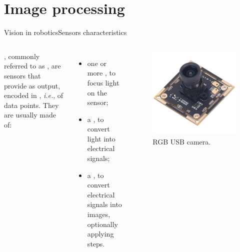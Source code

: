 
\section{Image processing}
\graphicspath{{figs/section2/}}

\begin{frame}{Vision in robotics}{Sensors characteristics}
	\begin{columns}
		, commonly referred to as , are sensors that provide  as output, encoded in , \emph{i.e.},  of data points. They are usually made of:
		\begin{itemize}
			\item one or more , to focus light on the sensor;
			\item a , to convert light into electrical signals;
			\item a , to convert electrical signals into images, optionally applying  steps.
		\end{itemize}

		\begin{figure}
			\centering
			\includegraphics[width=.7\textwidth]{rgbcam}
			\caption{RGB USB camera.}
			\label{fig:rgbcam}
		\end{figure}
	\end{columns}
\end{frame}
